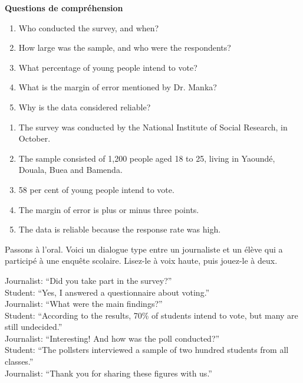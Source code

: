 \documentclass[11pt]{article}
\newcounter{popsec}
\newcounter{popsub}
\newcommand{\courssub}[1]{%
  \stepcounter{popsub}%
  \par\vspace{9pt}\noindent{\popxbold\fontsize{11.5}{13}\selectfont\color{popink}{\color{poporange}\thepopsec.\thepopsub}\hspace{6pt}#1}\par\nopagebreak\vspace{4pt}
}
\begin{document}
\textbf{Questions de compréhension}

\begin{enumerate}
\item Who conducted the survey, and when?
\item How large was the sample, and who were the respondents?
\item What percentage of young people intend to vote?
\item What is the margin of error mentioned by Dr. Manka?
\item Why is the data considered reliable?
\end{enumerate}

\begin{corrige}
\begin{enumerate}
\item The survey was conducted by the National Institute of Social Research, in October.
\item The sample consisted of 1,200 people aged 18 to 25, living in Yaoundé, Douala, Buea and Bamenda.
\item 58 per cent of young people intend to vote.
\item The margin of error is plus or minus three points.
\item The data is reliable because the response rate was high.
\end{enumerate}
\end{corrige}

\courssub{Dire : un dialogue modèle}

Passons à l'oral. Voici un dialogue type entre un journaliste et un élève qui a participé à une enquête scolaire. Lisez-le à voix haute, puis jouez-le à deux.

\begin{textebox}
Journalist: “Did you take part in the survey?”\\
Student: “Yes, I answered a questionnaire about voting.”\\
Journalist: “What were the main findings?”\\
Student: “According to the results, 70\% of students intend to vote, but many are still undecided.”\\
Journalist: “Interesting! And how was the poll conducted?”\\
Student: “The pollsters interviewed a sample of two hundred students from all classes.”\\
Journalist: “Thank you for sharing these figures with us.”
\end{textebox}
\end{document}

